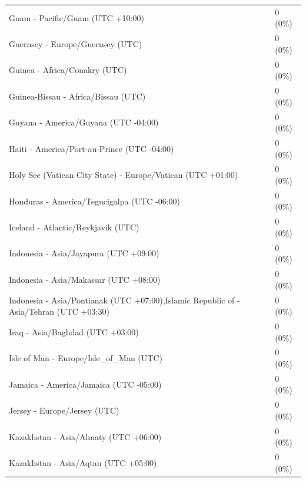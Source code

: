 \documentclass[
  english,
  man]{apa6}
\begin{document}
\begin{appendix}
\begin{table}
{\begin{tabular}[t]{ll}
\hspace{1em}Guam - Pacific/Guam (UTC +10:00) & 0 (0\%)\\
\hspace{1em}Guernsey - Europe/Guernsey (UTC) & 0 (0\%)\\
\addlinespace
\hspace{1em}Guinea - Africa/Conakry (UTC) & 0 (0\%)\\
\hspace{1em}Guinea-Bissau - Africa/Bissau (UTC) & 0 (0\%)\\
\hspace{1em}Guyana - America/Guyana (UTC -04:00) & 0 (0\%)\\
\hspace{1em}Haiti - America/Port-au-Prince (UTC -04:00) & 0 (0\%)\\
\hspace{1em}Holy See (Vatican City State) - Europe/Vatican (UTC +01:00) & 0 (0\%)\\
\addlinespace
\hspace{1em}Honduras - America/Tegucigalpa (UTC -06:00) & 0 (0\%)\\
\hspace{1em}Iceland - Atlantic/Reykjavik (UTC) & 0 (0\%)\\
\hspace{1em}Indonesia - Asia/Jayapura (UTC +09:00) & 0 (0\%)\\
\hspace{1em}Indonesia - Asia/Makassar (UTC +08:00) & 0 (0\%)\\
\hspace{1em}Indonesia - Asia/Pontianak (UTC +07:00),Islamic Republic of - Asia/Tehran (UTC +03:30) & 0 (0\%)\\
\addlinespace
\hspace{1em}Iraq - Asia/Baghdad (UTC +03:00) & 0 (0\%)\\
\hspace{1em}Isle of Man - Europe/Isle\_of\_Man (UTC) & 0 (0\%)\\
\hspace{1em}Jamaica - America/Jamaica (UTC -05:00) & 0 (0\%)\\
\hspace{1em}Jersey - Europe/Jersey (UTC) & 0 (0\%)\\
\hspace{1em}Kazakhstan - Asia/Almaty (UTC +06:00) & 0 (0\%)\\
\addlinespace
\hspace{1em}Kazakhstan - Asia/Aqtau (UTC +05:00) & 0 (0\%)\\

\end{tabular}}
\end{table}
\end{appendix}
\end{document}
